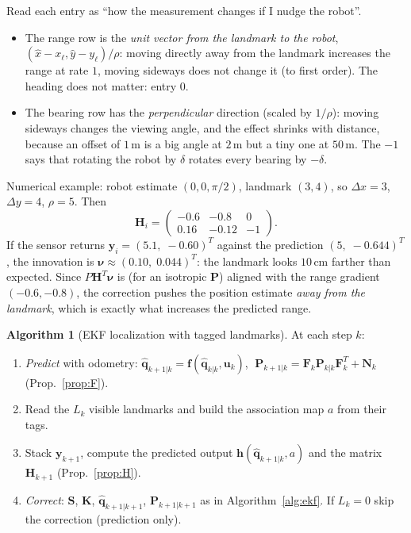 \documentclass[11pt,a4paper]{article}
\theoremstyle{definition}
\newtheorem{algorithm}[definition]{Algorithm}
\theoremstyle{plain}
\theoremstyle{remark}
\newcommand{\hq}{\hat{\bm q}}
\begin{document}
\begin{intuition}
Read each entry as ``how the measurement changes if I nudge the robot''.
\begin{itemize}
  \item The range row is the \emph{unit vector from the landmark to the robot}, $(\hat x-x_\ell,\hat y-y_\ell)/\rho$: moving directly away from the landmark increases the range at rate $1$, moving sideways does not change it (to first order). The heading does not matter: entry $0$.
  \item The bearing row has the \emph{perpendicular} direction (scaled by $1/\rho$): moving sideways changes the viewing angle, and the effect shrinks with distance, because an offset of $1$\,m is a big angle at $2$\,m but a tiny one at $50$\,m. The $-1$ says that rotating the robot by $\delta$ rotates every bearing by $-\delta$.
\end{itemize}
Numerical example: robot estimate $(0,0,\pi/2)$, landmark $(3,4)$, so $\Delta x=3$, $\Delta y=4$, $\rho=5$. Then
\[
\bm H_i=\begin{pmatrix}-0.6&-0.8&0\\ 0.16&-0.12&-1\end{pmatrix}.
\]
If the sensor returns $\bm y_i=(5.1,\;-0.60)^T$ against the prediction $(5,\;-0.644)^T$, the innovation is $\bm\nu\approx(0.10,\;0.044)^T$: the landmark looks $10$\,cm farther than expected. Since $P\bm H^T\bm\nu$ is (for an isotropic $\bm P$) aligned with the range gradient $(-0.6,-0.8)$, the correction pushes the position estimate \emph{away from the landmark}, which is exactly what increases the predicted range.
\end{intuition}

\begin{algorithm}[EKF localization with tagged landmarks]
\label{alg:ekfloc}
At each step $k$:
\begin{enumerate}[label=\textbf{\arabic*.},leftmargin=1.6em]
  \item \emph{Predict} with odometry: $\hq_{k+1|k}=\bm f(\hq_{k|k},\bm u_k)$, $\;\bm P_{k+1|k}=\bm F_k\bm P_{k|k}\bm F_k^T+\bm N_k$ (Prop.~\ref{prop:F}).
  \item Read the $L_k$ visible landmarks and build the association map $a$ from their tags.
  \item Stack $\bm y_{k+1}$, compute the predicted output $\bm h(\hq_{k+1|k},a)$ and the matrix $\bm H_{k+1}$ (Prop.~\ref{prop:H}).
  \item \emph{Correct}: $\bm S$, $\bm K$, $\hq_{k+1|k+1}$, $\bm P_{k+1|k+1}$ as in Algorithm~\ref{alg:ekf}. If $L_k=0$ skip the correction (prediction only).
\end{enumerate}
\end{algorithm}
\end{document}
